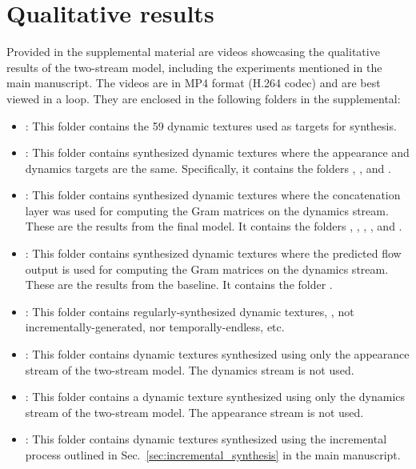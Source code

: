 \section{Qualitative results}
Provided in the supplemental material are videos showcasing the qualitative results of the two-stream model, including the experiments mentioned in the main manuscript. The videos are in MP4 format (H.264 codec) and are best viewed in a loop. They are enclosed in the following folders in the supplemental:
\begin{itemize}
	\item {}: This folder contains the 59 dynamic textures used as targets for synthesis.
	\item {}: This folder contains synthesized dynamic textures where the appearance and dynamics targets are the same. Specifically, it contains the folders , , and .
	\item {}: This folder contains synthesized dynamic textures where the concatenation layer was used for computing the Gram matrices on the dynamics stream. These are the results from the final model. It contains the folders , , , , and .
	\item {}: This folder contains synthesized dynamic textures where the predicted flow output is used for computing the Gram matrices on the dynamics stream. These are the results from the baseline. It contains the folder .
	\item {}: This folder contains regularly-synthesized dynamic textures, \ie, not incrementally-generated, nor temporally-endless, etc.
	\item {}: This folder contains dynamic textures synthesized using only the appearance stream of the two-stream model. The dynamics stream is not used.
	\item {}: This folder contains a dynamic texture synthesized using only the dynamics stream of the two-stream model. The appearance stream is not used.
	\item {}: This folder contains dynamic textures synthesized using the incremental process outlined in Sec.\ \ref{sec:incremental_synthesis} in the main manuscript.

\end{itemize}
